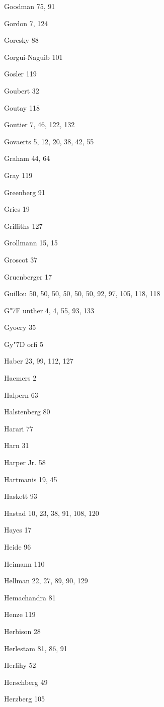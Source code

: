 \begin{theindex}
\item Goodman 75, 91
\item Gordon 7, 124
\item Goresky 88
\item Gorgui-Naguib 101
\item Gosler 119
\item Goubert 32
\item Goutay 118
\item Goutier 7, 46, 122, 132
\item Govaerts 5, 12, 20, 38, 42, 55
\item Graham 44, 64
\item Gray 119
\item Greenberg 91
\item Gries 19
\item Griffiths 127
\item Grollmann 15, 15
\item Groscot 37
\item Gruenberger 17
\item Guillou 50, 50, 50, 50, 50, 50, 92, 97, 105, 118, 118
\item G{\accent "7F u}nther 4, 4, 55, 93, 133
\item Gyoery 35
\item Gy{\accent "7D o}rfi 5
\item Haber 23, 99, 112, 127
\item Haemers 2
\item Halpern 63
\item Halstenberg 80
\item Harari 77
\item Harn 31
\item {Harper Jr.} 58
\item Hartmanis 19, 45
\item Haskett 93
\item Hastad 10, 23, 38, 91, 108, 120
\item Hayes 17
\item Heide 96
\item Heimann 110
\item Hellman 22, 27, 89, 90, 129
\item Hemachandra 81
\item Henze 119
\item Herbison 28
\item Herlestam 81, 86, 91
\item Herlihy 52
\item Herschberg 49
\item Herzberg 105

\end{theindex}
